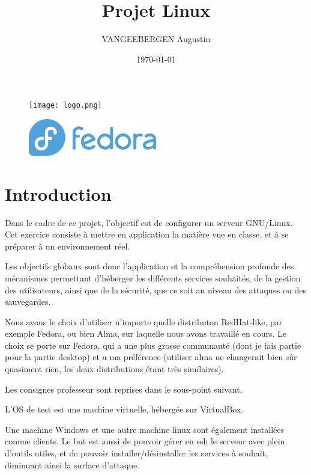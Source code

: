 \documentclass{article}
\title{Projet Linux}
\author{VANGEEBERGEN Augustin}
\date{\today}
\begin{document}
	
	\maketitle
	
	\begin{figure}[h]
		\centering
		\texttt{[image: logo.png]}
		\label{fig:logoheh}
	\end{figure}
	
	\begin{figure}[h!]
		\centering
		\includegraphics[width=0.5\textwidth]{fedora.png}
		\label{fig:logoheh}
	\end{figure}
	

	
	\newpage


	\tableofcontents
	\newpage
	

	
\section{Introduction}
Dans le cadre de ce projet, l'objectif est de configurer un serveur GNU/Linux. Cet exercice consiste à mettre en application la matière vue en classe, et à se préparer à un environnement réel.
	
Les objectifs globaux sont donc l'application et la compréhension profonde des mécanismes permettant d'héberger les différents services souhaités, de la gestion des utilisateurs, ainsi que de la sécurité, que ce soit au niveau des attaques ou des sauvegardes.

Nous avons le choix d'utiliser n'importe quelle distributon RedHat-like, par exemple Fedora, ou bien Alma, sur laquelle nous avons travaillé en cours.
Le choix se porte sur Fedora, qui a une plus grosse communauté (dont je fais partie pour la partie desktop) et a ma préférence (utiliser alma ne changerait bien sûr quasiment rien, les deux distributions étant très similaires).

	
Les consignes professeur sont reprises dans le sous-point suivant.

	
L'OS de test est une machine virtuelle, hébergée sur VirtualBox. 
	
Une machine Windows et une autre machine linux sont également installées comme clients.
Le but est aussi de pouvoir gérer en ssh le serveur avec plein d'outils utiles, et de pouvoir installer/désinstaller les services à souhait, diminuant ainsi la surface d'attaque.
	
\end{document}
